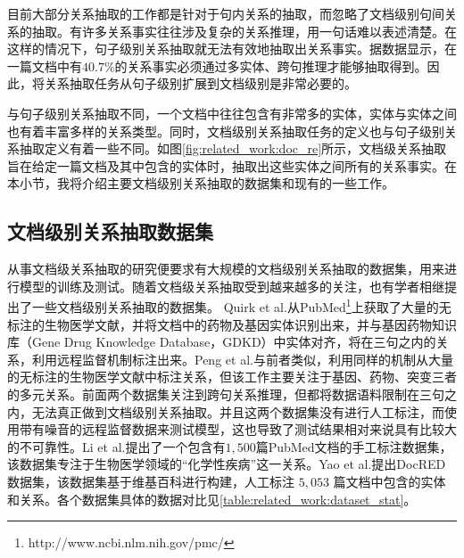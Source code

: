 目前大部分关系抽取的工作都是针对于句内关系的抽取，而忽略了文档级别句间关系的抽取。有许多关系事实往往涉及复杂的关系推理，用一句话难以表述清楚。在这样的情况下，句子级别关系抽取就无法有效地抽取出关系事实。据数据显示，在一篇文档中有$40.7\%$的关系事实必须通过多实体、跨句推理才能够抽取得到\cite{yao2019docred}。因此，将关系抽取任务从句子级别扩展到文档级别是非常必要的。

与句子级别关系抽取不同，一个文档中往往包含有非常多的实体，实体与实体之间也有着丰富多样的关系类型。同时，文档级别关系抽取任务的定义也与句子级别关系抽取定义有着一些不同。如图\ref{fig:related_work:doc_re}所示，文档级关系抽取旨在给定一篇文档及其中包含的实体时，抽取出这些实体之间所有的关系事实。在本小节，我将介绍主要文档级别关系抽取的数据集和现有的一些工作。

\subsection{文档级别关系抽取数据集}
从事文档级关系抽取的研究便要求有大规模的文档级别关系抽取的数据集，用来进行模型的训练及测试。随着文档级关系抽取受到越来越多的关注，也有学者相继提出了一些文档级别关系抽取的数据集。
Quirk et al.\cite{quirk2017distant}从PubMed\footnote{http://www.ncbi.nlm.nih.gov/pmc/}上获取了大量的无标注的生物医学文献，并将文档中的药物及基因实体识别出来，并与基因药物知识库（Gene Drug Knowledge Database，GDKD）中实体对齐，将在三句之内的关系，利用远程监督机制标注出来。Peng et al.\cite{peng2017cross}与前者类似，利用同样的机制从大量的无标注的生物医学文献中标注关系，但该工作主要关注于基因、药物、突变三者的多元关系。前面两个数据集关注到跨句关系推理，但都将数据语料限制在三句之内，无法真正做到文档级别关系抽取。并且这两个数据集没有进行人工标注，而使用带有噪音的远程监督数据来测试模型，这也导致了测试结果相对来说具有比较大的不可靠性。Li et al.\cite{li2016biocreative}提出了一个包含有$1,500$篇PubMed文档的手工标注数据集，该数据集专注于生物医学领域的“化学性疾病”这一关系。Yao et al.\cite{yao2019docred}提出DocRED数据集，该数据集基于维基百科进行构建，人工标注 $5,053$ 篇文档中包含的实体和关系。各个数据集具体的数据对比见\ref{table:related_work:dataset_stat}。

